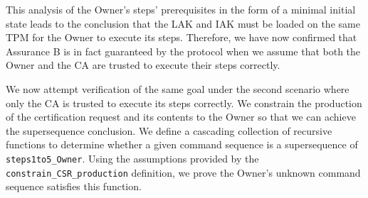 \documentclass[runningheads]{llncs}
\begin{document}




This analysis of the Owner's steps' prerequisites in the form of a
minimal initial state leads to the conclusion that the LAK and IAK
must be loaded on the same TPM for the Owner to execute its
steps. 
Therefore, we have now confirmed that Assurance B is in fact guaranteed by the
protocol when we assume that both the Owner and the CA are trusted to
execute their steps correctly.


We now attempt verification of the same goal under the second scenario
where only the CA is trusted to execute its steps correctly. We
constrain the production of the certification request and its contents
to the Owner so that we can achieve the supersequence conclusion. We
define a cascading collection of recursive functions to determine
whether a given command sequence is a supersequence of
\verb|steps1to5_Owner|.  Using the assumptions provided by the
\verb|constrain_CSR_production| definition, we prove the Owner's
unknown command sequence satisfies this function.
\end{document}

